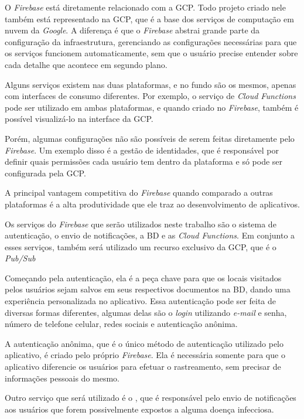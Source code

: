 O \textit{Firebase} está diretamente relacionado com a GCP. Todo projeto criado nele também está representado na GCP, que é a base dos serviços de computação em nuvem da \textit{Google}. A diferença é que o \textit{Firebase} abstrai grande parte da configuração da infraestrutura, gerenciando as configurações necessárias para que os serviços funcionem automaticamente, sem que o usuário precise entender sobre cada detalhe que acontece em segundo plano.

Alguns serviços existem nas duas plataformas, e no fundo são os mesmos, apenas com interfaces de consumo diferentes. Por exemplo, o serviço de \textit{Cloud Functions} pode ser utilizado em ambas plataformas, e quando criado no \textit{Firebase}, também é possível visualizá-lo na interface da GCP.

Porém, algumas configurações não são possíveis de serem feitas diretamente pelo \textit{Firebase}. Um exemplo disso é a gestão de identidades, que é responsável por definir quais permissões cada usuário tem dentro da plataforma e só pode ser configurada pela GCP.

A principal vantagem competitiva do \textit{Firebase} quando comparado a outras plataformas é a alta produtividade que ele traz ao desenvolvimento de aplicativos.

Os serviços do \textit{Firebase} que serão utilizados neste trabalho são o sistema de autenticação, o envio de notificações, a BD e as \textit{Cloud Functions}. Em conjunto a esses serviços, também será utilizado um recurso exclusivo da GCP, que é o \textit{Pub/Sub}

Começando pela autenticação, ela é a peça chave para que os locais visitados pelos usuários sejam salvos em seus respectivos documentos na BD, dando uma experiência personalizada no aplicativo. Essa autenticação pode ser feita de diversas formas diferentes, algumas delas são o \textit{login} utilizando \textit{e-mail} e senha, número de telefone celular, redes sociais e autenticação anônima.

A autenticação anônima, que é o único método de autenticação utilizado pelo aplicativo, é criado pelo próprio \textit{Firebase}. Ela é necessária somente para que o aplicativo diferencie os usuários para efetuar o rastreamento, sem precisar de informações pessoais do mesmo.

Outro serviço que será utilizado é o , que é responsável pelo envio de notificações aos usuários que forem possivelmente expostos a alguma doença infecciosa.

